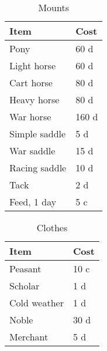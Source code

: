 \documentclass[a4paper,11pt,oneside]{book}
\begin{document}
\begin{table}[ht]
	\centering
	\caption{Mounts}
	\begin{tabular}{|l|l|}
		\hline
		Item & Cost\\ [0.5ex]
		\hline
		Pony & 60 d\\
		Light horse & 60 d\\
		Cart horse & 80 d\\
		Heavy horse & 80 d\\
		War horse & 160 d\\
		\hline
		Simple saddle & 5 d\\
		War saddle & 15 d\\
		Racing saddle & 10 d\\
		Tack & 2 d\\
		Feed, 1 day & 5 c\\
		\hline
	\end{tabular}
\end{table}

\begin{table}[ht]
	\centering
	\caption{Clothes}
	\begin{tabular}{|l|l|}
		\hline
		Item & Cost\\ [0.5ex]
		\hline
		Peasant & 10 c\\
		Scholar & 1 d\\
		Cold weather & 1 d\\
		Noble & 30 d\\
		Merchant & 5 d\\
		\hline
	\end{tabular}
\end{table}





\listoftables
\end{document}
